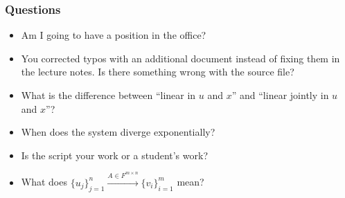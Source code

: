 \subsubsection{Questions}
\begin{itemize}
\item Am I going to have a position in the office?
\item You corrected typos with an additional document instead of fixing them in the lecture notes. Is there something wrong with the source file?
\item What is the difference between ``linear in $u$ and $x$'' and ``linear jointly in $u$ and $x$''?
\item When does the system diverge exponentially?
\item Is the script your work or a student's work?
\item What does $\{u_j\}_{j=1}^n \xrightarrow[]{A \in F^{m \times n}} \{v_i\}_{i=1}^m$ mean?
\end{itemize}